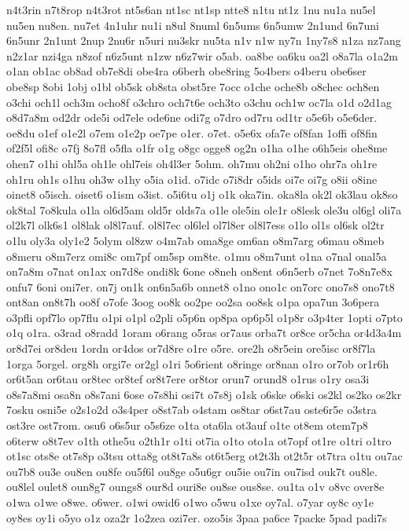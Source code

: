 {n4t3rin
n7t8rop
n4t3rot
nt5s6an
nt1sc
nt1sp
ntte8
n1tu
nt1z
1nu
nu1a
nu5el
nu5en
nu8en.
nu7et
4n1uhr
nu1i
n8ul
8numl
6n5ums
6n5umw
2n1und
6n7uni
6n5unr
2n1unt
2nup
2nu6r
n5uri
nu3skr
nu5ta
n1v
n1w
ny7n
1ny7s8
n1za
nz7ang
n2z1ar
nzi4ga
n8zof
n6z5unt
n1zw
n6z7wir
o5ab.
oa8be
oa6ku
oa2l
o8a7la
o1a2m
o1an
ob1ac
ob8ad
ob7e8di
obe4ra
o6berh
obe8ring
5o4bers
o4beru
obe6ser
obe8sp
8obi
1obj
o1bl
ob5sk
ob8sta
obst5re
7occ
o1che
oche8b
o8chec
och8en
o3chi
och1l
och3m
ocho8f
o3chro
och7t6e
och3to
o3chu
och1w
oc7la
o1d
o2d1ag
o8d7a8m
od2dr
ode5i
od7ele
ode6ne
odi7g
o7dro
od7ru
od1tr
o5e6b
o5e6der.
oe8du
o1ef
o1e2l
o7em
o1e2p
oe7pe
o1er.
o7et.
o5e6x
ofa7e
of8fan
1offi
of8fin
of2f5l
ofi8c
o7fj
8o7fl
o5fla
o1fr
o1g
o8gc
ogge8
og2n
o1ha
o1he
o6h5eis
ohe8me
ohen7
o1hi
ohl5a
oh1le
ohl7eis
oh4l3er
5ohm.
oh7mu
oh2ni
o1ho
ohr7a
oh1re
oh1ru
oh1s
o1hu
oh3w
o1hy
o5ia
o1id.
o7idc
o7i8dr
o5ids
oi7e
oi7g
o8ii
o8ine
oinet8
o5isch.
oiset6
o1ism
o3ist.
o5i6tu
o1j
o1k
oka7in.
oka8la
ok2l
ok3lau
ok8so
ok8tal
7o8kula
o1la
ol6d5am
old5r
olds7a
o1le
ole5in
ole1r
o8lesk
ole3u
ol6gl
oli7a
ol2k7l
olk6s1
ol8lak
ol8l7auf.
ol8l7ec
ol6lel
ol7l8er
ol8l7ess
o1lo
ol1s
ol6sk
ol2tr
o1lu
oly3a
oly1e2
5olym
ol8zw
o4m7ab
oma8ge
om6an
o8m7arg
o6mau
o8meb
o8meru
o8m7erz
omi8c
om7pf
om5sp
om8te.
o1mu
o8m7unt
o1na
o7nal
onal5a
on7a8m
o7nat
on1ax
on7d8e
ondi8k
6one
o8neh
on8ent
o6n5erb
o7net
7o8n7e8x
onfu7
6oni
oni7er.
on7j
on1k
on6n5a6b
onnet8
o1no
ono1c
on7orc
ono7s8
ono7t8
ont8an
on8t7h
oo8f
o7ofe
3oog
oo8k
oo2pe
oo2sa
oo8sk
o1pa
opa7un
3o6pera
o3pfli
opf7lo
op7flu
o1pi
o1pl
o2pli
o5p6n
op8pa
op6p5l
o1p8r
o3p4ter
1opti
o7pto
o1q
o1ra.
o3rad
o8radd
1oram
o6rang
o5ras
or7aus
orba7t
or8ce
or5cha
or4d3a4m
or8d7ei
or8deu
1ordn
or4dos
or7d8re
o1re
o5re.
ore2h
o8r5ein
ore5isc
or8f7la
1orga
5orgel.
org8h
orgi7e
or2gl
o1ri
5o6rient
o8ringe
or8nan
o1ro
or7ob
or1r6h
or6t5an
or6tau
or8tec
or8tef
or8t7ere
or8tor
orun7
orund8
o1rus
o1ry
osa3i
o8s7a8mi
osa8n
o8s7ani
6ose
o7s8hi
osi7t
o7s8j
o1sk
o6ske
o6ski
os2kl
os2ko
os2kr
7osku
osni5e
o2s1o2d
o3s4per
o8st7ab
o4stam
os8tar
o6st7au
oste6r5e
o3stra
ost3re
ost7rom.
osu6
o6s5ur
o5s6ze
o1ta
ota6la
ot3auf
o1te
ot8em
otem7p8
o6terw
o8t7ev
o1th
othe5u
o2th1r
o1ti
ot7ia
o1to
oto1a
ot7opf
ot1re
o1tri
o1tro
ot1sc
ots8e
ot7s8p
o3tsu
otta8g
ot8t7a8s
ot6t5erg
ot2t3h
ot2t5r
ot7tra
o1tu
ou7ac
ou7b8
ou3e
ou8en
ou8fe
ou5f6l
ou8ge
o5u6gr
ou5ie
ou7in
ou7isd
ouk7t
ou8le.
ou8lel
oulet8
oun8g7
oungs8
our8d
ouri8e
ou8se
ous8se.
ou1ta
o1v
o8vc
over8e
o1wa
o1we
o8we.
o6wer.
o1wi
owid6
o1wo
o5wu
o1xe
oy7al.
o7yar
oy8c
oy1e
oy8es
oy1i
o5yo
o1z
oza2r
1o2zea
ozi7er.
ozo5is
3paa
pa6ce
7packe
5pad
padi7s
}
